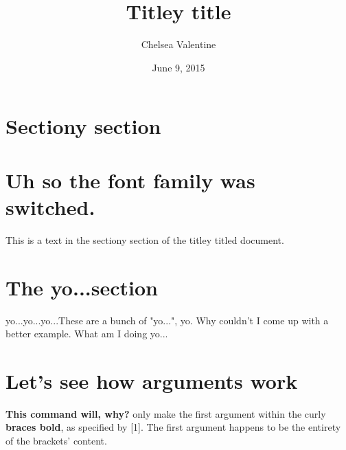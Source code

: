 \documentclass[a4paper, 11pt]{article}
\newcommand{\yo}{yo...}
\newcommand{\keyword}[1]{\textbf{#1}}
\begin{document}
\title{Titley title}
\author{Chelsea Valentine}
\date{June 9, 2015}
\maketitle


\section{Sectiony section}
\section{\sffamily Uh so the font family was switched.}
This is a text in the sectiony section of the titley titled document.
\bigskip


\section{The \yo section}
\yo \yo \yo These are a bunch of "yo...", yo. Why couldn't I come up with a better example. What am I doing \yo

\bigskip
\section{Let's see how arguments work}
\keyword{This command will, {why?}} only make the first argument within the curly
\keyword{braces bold}, as specified by [1]. The first argument happens to be the entirety of the brackets' content.
\end{document}
